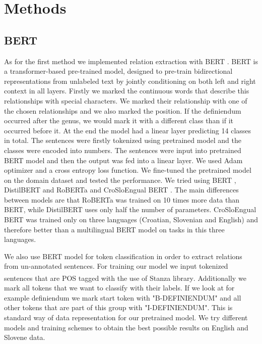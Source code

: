 \documentclass[fleqn,moreauthors,10pt]{ds_report}
\begin{document}

\section{Methods}
\subsection{BERT}
\par As for the first method we implemented relation extraction with BERT  \cite{BERT:DBLP:journals/corr/abs-1810-04805}. BERT is a transformer-based pre-trained model, designed to pre-train bidirectional representations from unlabeled text by jointly conditioning on both left and right context in all layers. Firstly we marked the continuous words that describe this relationships with special characters. We marked their relationship with one of the chosen relationships and we also marked the position. If the definiendum occurred after the genus, we would mark it with a different class than if it occurred before it. At the end the model had a linear layer predicting 14 classes in total. The sentences were firstly tokenized using pretrained model and the classes were encoded into numbers. The sentences were input into pretrained BERT model and then the output was fed into a linear layer. We used Adam optimizer and a cross entropy loss function. We fine-tuned the pretrained model on the domain dataset and tested the performance. We tried using BERT \cite{BERT:DBLP:journals/corr/abs-1810-04805}, DistilBERT \cite{distiledBert:DBLP:journals/corr/abs-1910-01108} and RoBERTa \cite{roberta:DBLP:journals/corr/abs-1907-11692} and CroSloEngual BERT \cite{ulcar-robnik2020finest}. The main differences between models are that RoBERTa was trained on 10 times more data than BERT, while DistilBERT uses only half the number of parameters. CroSloEngual BERT was trained only on three languages (Croatian, Slovenian and English) and therefore better than a multilingual BERT model on tasks in this three languages. 

\par We also use BERT model for token classification in order to extract relations from un-annotated sentences. For training our model we input tokenized sentences that are POS tagged with the use of Stanza library\textsuperscript{\cite{qi2020stanza}}. Additionally we mark all tokens that we want to classify with their labels. If we look at for example definiendum we mark start token with "B-DEFINIENDUM" and all other tokens that are part of this group with "I-DEFINIENDUM". This is standard way of data representation for our pretrained model. We try different models and training schemes to obtain the best possible results on English and Slovene data. 
\end{document}

